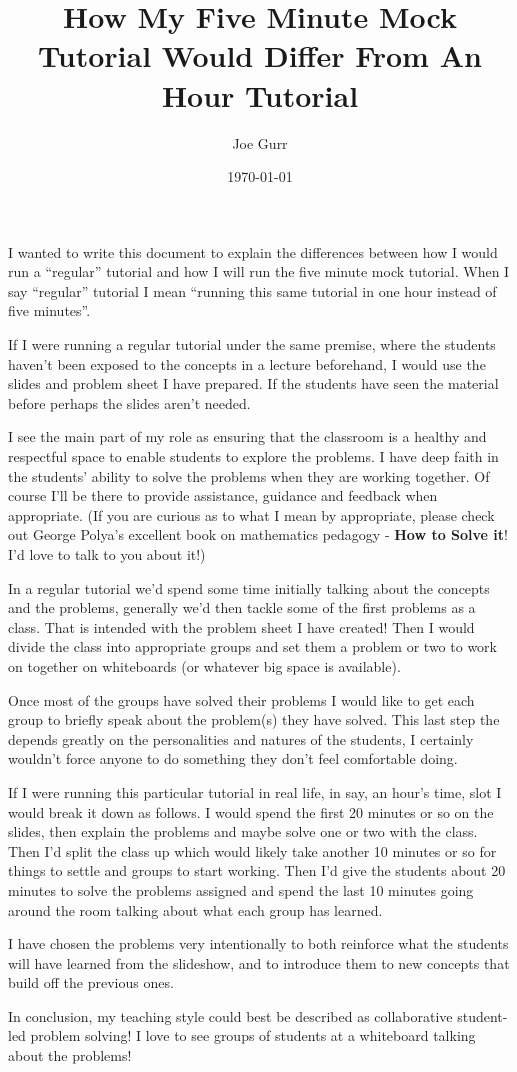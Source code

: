 \documentclass{article}
\begin{document}
\title{How My Five Minute Mock Tutorial Would Differ From An Hour Tutorial}
\author{Joe Gurr}
\date{\today}

\maketitle

I wanted to write this document to explain the differences between how I would run a ``regular'' tutorial
and how I will run the five minute mock tutorial. When I say ``regular'' tutorial I mean
``running this same tutorial in one hour instead of five minutes''.

If I were running a regular tutorial under the same premise,
where the students haven't been exposed to the concepts in a lecture beforehand,
I would use the slides and problem sheet I have prepared.
If the students have seen the material before
perhaps the slides aren't needed.

I see the main part of my role as ensuring that the classroom is a healthy and respectful space to
enable students to explore the problems.
I have deep faith in the students' ability to solve the problems when they are working together.
Of course I'll be there to provide assistance, guidance and feedback when appropriate.
(If you are curious as to what I mean by appropriate, please check out George Polya's excellent book on mathematics pedagogy
- \textbf{How to Solve it}! I'd love to talk to you about it!)

In a regular tutorial we'd spend some time initially talking about the concepts and the problems,
generally we'd then tackle some of the first problems as a class. That is intended with the problem sheet I have created!
Then I would divide the class into appropriate groups and set them a problem or two to work on together on whiteboards (or whatever big space is available).

Once most of the groups have solved their problems I would like to get each group to briefly speak
about the problem(s) they have solved.
This last step the depends greatly on the personalities and natures of the students,
I certainly wouldn't force anyone to do something they don't feel comfortable doing.

If I were running this particular tutorial in real life, in say, an hour's time, slot I would break it down as follows.
I would spend the first 20 minutes or so on the slides, then explain the problems and maybe solve one or two with the class.
Then I'd split the class up which would likely take another 10 minutes or so for things to settle and groups to start working.
Then I'd give the students about 20 minutes to solve the problems assigned and spend the last 10 minutes
going around the room talking about what each group has learned.

I have chosen the problems very intentionally to both reinforce what the students will have learned from the
slideshow, and to introduce them to new concepts that build off the previous ones.

In conclusion, my teaching style could best be described as collaborative
student-led problem solving!
I love to see groups of students at a whiteboard talking about the problems!
\end{document}

